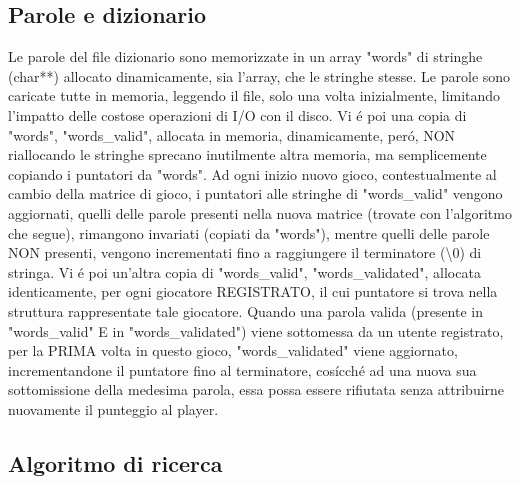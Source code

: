 \subsection{Parole e dizionario}

Le parole del file dizionario sono memorizzate in un array "words" di stringhe (char**) allocato dinamicamente, sia l'array, che le stringhe stesse. Le parole sono caricate tutte in memoria, leggendo il file, solo una volta inizialmente, limitando l'impatto delle costose operazioni di I/O con il disco. Vi \'e poi una copia di "words", "words\_valid", allocata in memoria, dinamicamente, per\'o, NON riallocando le stringhe sprecano inutilmente altra memoria, ma semplicemente copiando i puntatori da "words". Ad ogni inizio nuovo gioco, contestualmente al cambio della matrice di gioco, i puntatori alle stringhe di "words\_valid" vengono aggiornati, quelli delle parole presenti nella nuova matrice (trovate con l'algoritmo che segue), rimangono invariati (copiati da "words"), mentre quelli delle parole NON presenti, vengono incrementati fino a raggiungere il terminatore (\textbackslash0) di stringa. Vi \'e poi un'altra copia di "words\_valid", "words\_validated", allocata identicamente, per ogni giocatore REGISTRATO, il cui puntatore si trova nella struttura rappresentate tale giocatore. Quando una parola valida (presente in "words\_valid" E in "words\_validated") viene sottomessa da un utente registrato, per la PRIMA volta in questo gioco, "words\_validated" viene aggiornato, incrementandone il puntatore fino al terminatore, cos\'icch\'e ad una nuova sua sottomissione della medesima parola, essa possa essere rifiutata senza attribuirne nuovamente il punteggio al player.
\\

\subsection{Algoritmo di ricerca}

